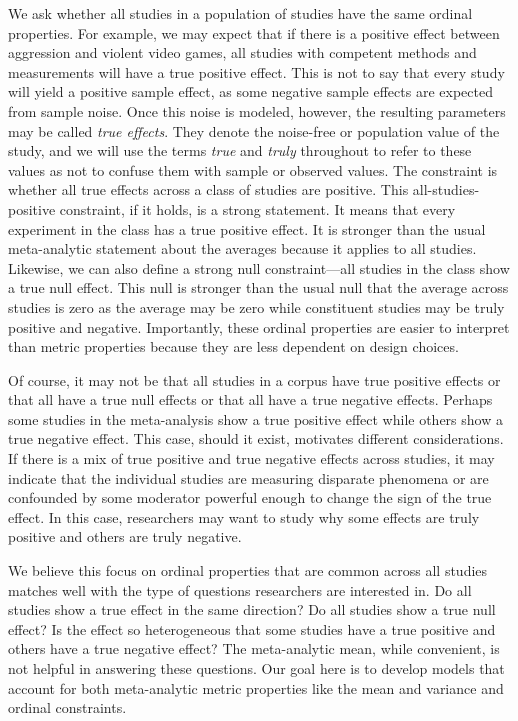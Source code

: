 \documentclass[english,man]{apa6}
\theoremstyle{definition}
\theoremstyle{definition}
\theoremstyle{definition}
\theoremstyle{remark}
\begin{document}
We ask whether all studies in a population of studies have the same
ordinal properties. For example, we may expect that if there is a
positive effect between aggression and violent video games, all studies
with competent methods and measurements will have a true positive
effect. This is not to say that every study will yield a positive sample
effect, as some negative sample effects are expected from sample noise.
Once this noise is modeled, however, the resulting parameters may be
called \emph{true effects}. They denote the noise-free or population
value of the study, and we will use the terms \emph{true} and
\emph{truly} throughout to refer to these values as not to confuse them
with sample or observed values. The constraint is whether all true
effects across a class of studies are positive. This
all-studies-positive constraint, if it holds, is a strong statement. It
means that every experiment in the class has a true positive effect. It
is stronger than the usual meta-analytic statement about the averages
because it applies to all studies. Likewise, we can also define a strong
null constraint---all studies in the class show a true null effect. This
null is stronger than the usual null that the average across studies is
zero as the average may be zero while constituent studies may be truly
positive and negative. Importantly, these ordinal properties are easier
to interpret than metric properties because they are less dependent on
design choices.

Of course, it may not be that all studies in a corpus have true positive
effects or that all have a true null effects or that all have a true
negative effects. Perhaps some studies in the meta-analysis show a true
positive effect while others show a true negative effect. This case,
should it exist, motivates different considerations. If there is a mix
of true positive and true negative effects across studies, it may
indicate that the individual studies are measuring disparate phenomena
or are confounded by some moderator powerful enough to change the sign
of the true effect. In this case, researchers may want to study why some
effects are truly positive and others are truly negative.

We believe this focus on ordinal properties that are common across all
studies matches well with the type of questions researchers are
interested in. Do all studies show a true effect in the same direction?
Do all studies show a true null effect? Is the effect so heterogeneous
that some studies have a true positive and others have a true negative
effect? The meta-analytic mean, while convenient, is not helpful in
answering these questions. Our goal here is to develop models that
account for both meta-analytic metric properties like the mean and
variance and ordinal constraints.
\end{document}
